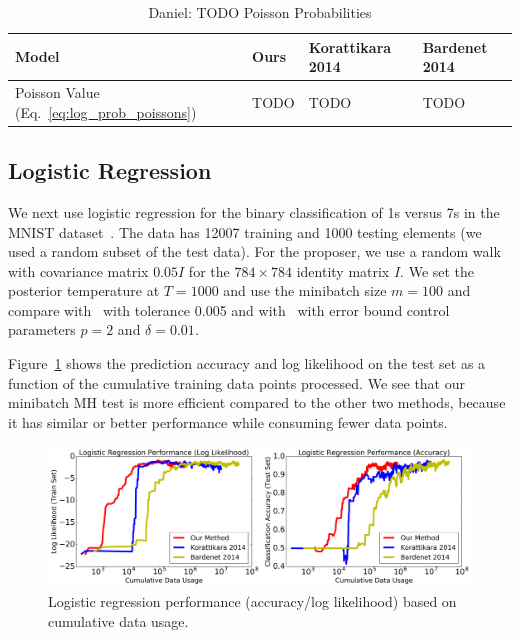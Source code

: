\documentclass{article}
\begin{document}
\begin{table}[t]
    \caption{\color{blue} Daniel: TODO Poisson Probabilities}
    \label{tab:poissons}
    \centering
    \begin{tabular}{l l l l}
    \toprule
    Model & Ours & Korattikara 2014 & Bardenet 2014 \\
    \midrule
    Poisson Value (Eq.~\ref{eq:log_prob_poissons}) & TODO & TODO & TODO \\
    \bottomrule
    \end{tabular}
\end{table}




\subsection{Logistic Regression}\label{ssec:logistic}

We next use logistic regression for the binary classification of 1s versus 7s in
the MNIST dataset~\cite{lecun-mnisthandwrittendigit-2010}. The data has 12007
training and 1000 testing elements (we used a random subset of the test data).
For the proposer, we use a random walk with covariance matrix $0.05I$ for the
$784\times 784$ identity matrix $I$. We set the posterior temperature at
$T=1000$ and use the minibatch size $m=100$ and compare
with~\cite{cutting_mh_2014} with tolerance 0.005 and
with~\cite{icml2014c1_bardenet14} with error bound control parameters $p = 2$
and $\delta = 0.01$.

Figure~\ref{fig:logistic_performance} shows the prediction accuracy and log
likelihood on the test set as a function of the cumulative training data points
processed.  We see that our minibatch MH test is more efficient compared to the
other two methods, because it has similar or better performance while consuming
fewer data points.

\begin{figure}[t]
	\centering
	\includegraphics[width=1\linewidth]{logistic_performance.png}
	\caption{
    Logistic regression performance (accuracy/log likelihood) based on
    cumulative data usage.
    }
	\label{fig:logistic_performance}
\end{figure}
\end{document}
